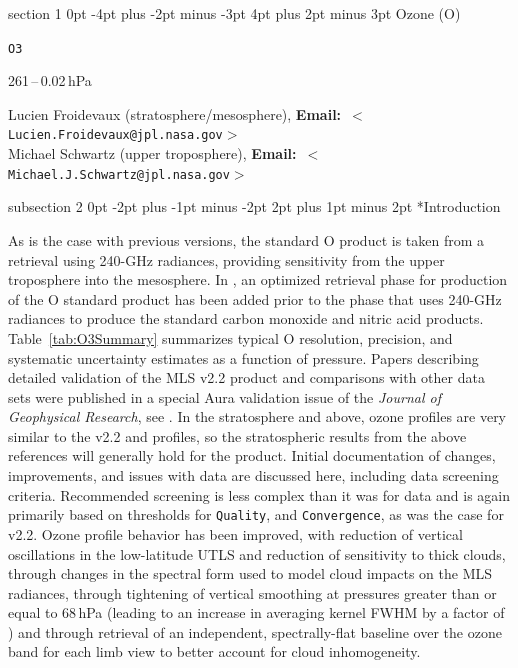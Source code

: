 \documentclass[11pt,draft]{report}
\makeatletter
\renewcommand{\section}{\@startsection%
  {section}%
  {1}%
  {0pt}%
  {-4pt plus -2pt minus -3pt}%
  {4pt plus 2pt minus 3pt}%
  {\Large\sffamily\fontseries{sb}\selectfont\flushleft\color{SectionColor}\figureversion{tabular}}}%
\renewcommand{\subsection}{\@startsection%
  {subsection}%
  {2}%
  {0pt}%
  {-2pt plus -1pt minus -2pt}%
  {2pt plus 1pt minus 2pt}%
  {\large\sffamily\fontseries{sb}\selectfont\flushleft\color{SectionColor}\figureversion{tabular}}}%
\newcommand{\speciestitle}[5][]{%
\cleardoublepage
\suppressfloats[t]%
\thispagestyle{plain}%
{\noindent\colorbox{SectionBackground}{%
\begin{minipage}{\linewidth-2\fboxsep}%
\flushleft%
\section{#2 (#3)}%
\rhead{\large\sffamily\color{HeaderFooterColor}\nouppercase{\thesection.\
  #2 (#3)}}
\label{navSection#4}%
\label{sec:Standard#4}%
\color{SectionColor}\sffamily
\begin{description}[font=\sffamily\bfseries,topsep=0pt,partopsep=0pt]
\item[Swath name:] \texttt{#4} #1
#5
\end{description}
\end{minipage}}}%
\renewcommand{\currentnav}{#4}%
}
\newcommand{\email}[1]{\mbox{\textbf{Email:} $<$\texttt{#1}$>$}}
\newcommand{\currentnav}{BLANK}
\makeatother
\begin{document}

 \speciestitle{Ozone}{O}{O3}{%
\item[Useful range:] 261\,--\,0.02\,hPa  
\item[Contact:] Lucien Froidevaux (stratosphere/mesosphere), 
  \email{Lucien.Froidevaux@jpl.nasa.gov} \\ 
  Michael Schwartz (upper troposphere), 
  \email{Michael.J.Schwartz@jpl.nasa.gov}}
 
\subsection*{Introduction} 

As is the case with previous versions, the \thisv standard O
product is taken from a retrieval using 240-GHz radiances, 
providing sensitivity from the upper troposphere into the mesosphere.
In \thisv, an optimized retrieval phase for production of the O\cs3
standard product has been added prior to the phase that uses
240-GHz radiances to produce the standard  carbon monoxide and nitric 
acid products.  Table~\ref{tab:O3Summary}
summarizes typical O resolution, precision, and systematic uncertainty
estimates as a function of pressure.  Papers describing detailed
validation of the MLS v2.2 product and comparisons with other data sets
were published in a special Aura validation issue of the {\it Journal of
  Geophysical Research}, see
\citep{FroidevauxEtal08O3,JiangYEtal07,LiveseyEtal08}.  In the
stratosphere and above, \thisv ozone profiles are very similar to the
v2.2 and \prevvSlash profiles, so the stratospheric results from the
above references will generally hold for the product.  Initial
documentation of changes, improvements, and issues with \thisv data are
discussed here, including data screening criteria.  Recommended
screening is less complex than it was for \prevvSlash data and is again
primarily based on thresholds for \texttt{Quality}, and
\texttt{Convergence}, as was the case for v2.2.  Ozone profile behavior
has been improved, with reduction of vertical oscillations in the
low-latitude UTLS and reduction of sensitivity to thick clouds, 
through changes in the spectral form used to model cloud impacts on the
MLS radiances, through tightening of vertical smoothing at pressures greater
than or equal to 68\,hPa (leading to an increase in averaging kernel
FWHM by a factor of \texttildelow1.15) and through retrieval of an independent,
spectrally-flat baseline over the ozone band for each limb view to
better account for cloud inhomogeneity.
\end{document}
